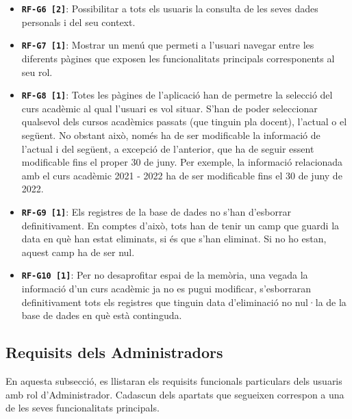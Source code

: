 \documentclass[a4paper,12pt]{ThesisStyle}
\begin{document}
\begin{itemize}
  \item \texttt{\textbf{RF-G6 [2]}}: Possibilitar a tots els usuaris la consulta de les seves dades personals i del seu context.
  \item \texttt{\textbf{RF-G7 [1]}}: Mostrar un menú que permeti a l'usuari navegar entre les diferents pàgines que exposen les funcionalitats principals corresponents al seu rol.
  \item \texttt{\textbf{RF-G8 [1]}}: Totes les pàgines de l'aplicació han de permetre la selecció del curs acadèmic al qual l'usuari es vol situar. S'han de poder seleccionar qualsevol dels cursos acadèmics passats (que tinguin pla docent), l'actual o el següent. No obstant això, només ha de ser modificable la informació de l'actual i del següent, a excepció de l'anterior, que ha de seguir essent modificable fins el proper 30 de juny. Per exemple, la informació relacionada amb el curs acadèmic 2021 - 2022 ha de ser modificable fins el 30 de juny de 2022.
  \item \texttt{\textbf{RF-G9 [1]}}: Els registres de la base de dades no s'han d'esborrar definitivament. En comptes d'això, tots han de tenir un camp que guardi la data en què han estat eliminats, si és que s'han eliminat. Si no ho estan, aquest camp ha de ser nul.
  \item \texttt{\textbf{RF-G10 [1]}}: Per no desaprofitar espai de la memòria, una vegada la informació d'un curs acadèmic ja no es pugui modificar, s'esborraran definitivament tots els registres que tinguin data d'eliminació no nul·la de la base de dades en què està continguda.
\end{itemize}


\subsection{Requisits dels Administradors}
\label{subsec:requisits_administradors}

En aquesta subsecció, es llistaran els requisits funcionals particulars dels usuaris amb rol d'Administrador. Cadascun dels apartats que segueixen correspon a una de les seves funcionalitats principals.
\end{document}
